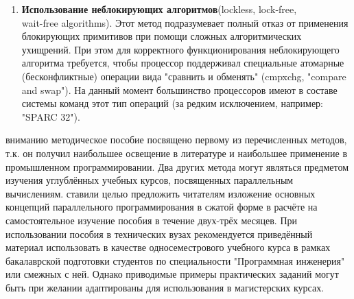 {\begin{enumerate}
		\item\textbf{Использование неблокирующих алгоритмов}\quad(lockless, lock-free,\\wait-free algorithms). Этот метод подразумевает полный отказ от применения блокирующих примитивов при помощи сложных алгоритмических ухищрений. При этом для корректного функционирования неблокирующего алгоритма требуется, чтобы процессор поддерживал специальные атомарные (бесконфликтные) операции вида "сравнить и обменять" (cmpxchg, "compare and swap"). На данный момент большинство процессоров имеют в составе системы команд этот тип операций (за редким исключением, например: "SPARC 32").
	\end{enumerate}
	 вниманию методическое пособие посвящено первому из перечисленных методов, т.к. он получил наибольшее освещение в литературе и наибольшее применение в промышленном программировании. Два других метода могут являться предметом изучения углублённых учебных курсов, посвященных параллельным вычислениям.
	 ставили целью предложить читателям изложение основных концепций параллельного программирования в сжатой форме в расчёте на самостоятельное изучение пособия в течение двух-трёх месяцев. При использовании пособия в технических вузах рекомендуется приведённый материал использовать в качестве односеместрового учебного курса в рамках бакалаврской подготовки студентов по специальности "Программная инженерия" или смежных с ней. Однако приводимые примеры практических заданий могут быть при желании адаптированы для использования в магистерских курсах.

}